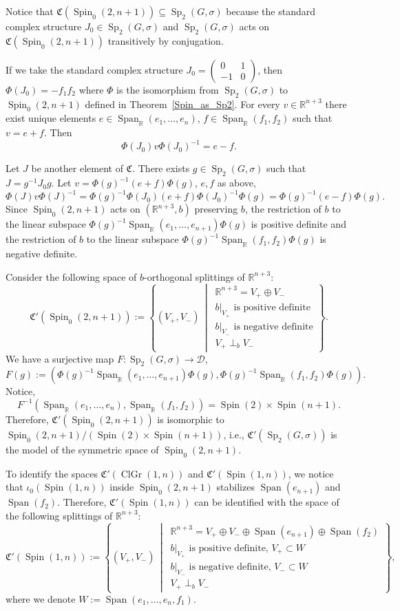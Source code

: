 \documentclass[a4paper,oneside,11pt]{amsart}
\DeclareMathOperator{\Span}{Span}
\DeclareMathOperator{\Sp}{Sp}
\DeclareMathOperator{\ClGr}{ClGr}
\DeclareMathOperator{\Spin}{Spin}
\newcommand{\midwd}{\,\middle\vert\,}
\newcommand{\R}{\mathbb R}
\newcommand{\Om}{
\begin{pmatrix}
0 & 1\\
-1 & 0
\end{pmatrix}}
\theoremstyle{plain}
\theoremstyle{definition}
\theoremstyle{remark}
\begin{document}
\vspace{2mm}

\noindent Notice that $\mathfrak C(\Spin_0(2,n+1))\subseteq\Sp_2(G,\sigma)$ because the standard complex structure $J_0\in\Sp_2(G,\sigma)$ and $\Sp_2(G,\sigma)$ acts on $\mathfrak C(\Spin_0(2,n+1))$ transitively by conjugation.

\noindent If we take the standard complex structure $J_0=\Om$, then $\Phi(J_0)=-f_1f_2$ where $\Phi$ is the isomorphism from $\Sp_2(G,\sigma)$ to $\Spin_0(2,n+1)$ defined in Theorem~\ref{Spin_as_Sp2}. For every $v\in\R^{n+3}$ there exist unique elements $e\in\Span_\R(e_1,\dots,e_n)$, $f\in\Span_\R(f_1,f_2)$ such that $v=e+f$. Then
$$\Phi(J_0)v\Phi(J_0)^{-1}=e-f.$$

\noindent Let $J$ be another element of $\mathfrak C$. There exists $g\in\Sp_2(G,\sigma)$ such that $J=g^{-1}J_0g$. Let $v=\Phi(g)^{-1}(e+f)\Phi(g)$, $e,f$ as above,
$$\Phi(J)v\Phi(J)^{-1}=\Phi(g)^{-1}\Phi(J_0)(e+f)\Phi(J_0)^{-1}\Phi(g)=\Phi(g)^{-1}(e-f)\Phi(g).$$
Since $\Spin_0(2,n+1)$ acts on $(\R^{n+3},b)$ preserving $b$, the restriction of $b$ to the linear subspace $\Phi(g)^{-1}\Span_\R(e_1,\dots,e_{n+1})\Phi(g)$ is positive definite and the restriction of $b$ to the linear subspace $\Phi(g)^{-1}\Span_\R(f_1,f_2)\Phi(g)$ is negative definite.

\noindent Consider the following space of $b$-orthogonal splittings of $\R^{n+3}$:
$$\mathfrak C'(\Spin_0(2,n+1)):=\left\{(V_+,V_-)\midwd \begin{array}{l}
\R^{n+3}=V_+\oplus V_-\\
b|_{V_+}\text{ is positive definite}\\
b|_{V_-}\text{ is negative definite}\\
V_+\perp_b V_-
\end{array}\right\}.$$
We have a surjective map $F\colon\Sp_2(G,\sigma)\to\mathcal D$,
$$F(g):=(\Phi(g)^{-1}\Span_\R(e_1,\dots,e_{n+1})\Phi(g),\Phi(g)^{-1}\Span_\R(f_1,f_2)\Phi(g)).$$
Notice,
$$F^{-1}(\Span_\R(e_1,\dots,e_n),\Span_\R(f_1,f_2))=\Spin(2)\times\Spin(n+1).$$
Therefore, $\mathfrak C'(\Spin_0(2,n+1))$ is isomorphic to $\Spin_0(2,n+1)/(\Spin(2)\times\Spin(n+1))$, i.e., $\mathfrak C'(\Sp_2(G,\sigma))$ is the model of the symmetric space of $\Spin_0(2,n+1)$. 

To identify the spaces $\mathfrak C'(\ClGr(1,n))$ and $\mathfrak C'(\Spin(1,n))$, we notice that $\iota_0(\Spin(1,n))$ inside $\Spin_0(2,n+1)$ stabilizes $\Span(e_{n+1})$ and $\Span(f_2)$. Therefore, $\mathfrak C'(\Spin(1,n))$ can be identified with the space of the following splittings of $\R^{n+3}$:
$$\mathfrak C'(\Spin(1,n)):=\left\{(V_+,V_-)\midwd \begin{array}{l}
\R^{n+3}=V_+\oplus V_-\oplus\Span(e_{n+1})\oplus\Span(f_{2})\\
b|_{V_+}\text{ is positive definite, }V_+\subset W\\
b|_{V_-}\text{ is negative definite, }V_-\subset W\\
V_+\perp_b V_-
\end{array}\right\},$$
where we denote $W:=\Span(e_1,\dots,e_n,f_1)$.
\end{document}
